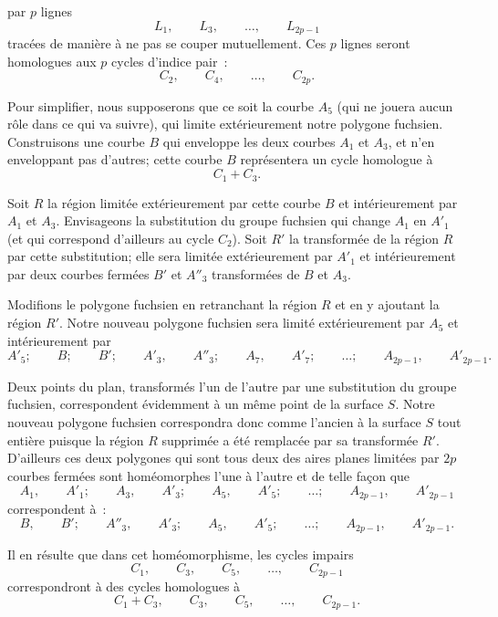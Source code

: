 \documentclass{article}
\begin{document}
par $p$ lignes
\[ L_{1}, \qquad L_{3}, \qquad \ldots, \qquad L_{2p-1} \]
tracées de manière à ne pas se couper mutuellement. Ces $p$ lignes seront homologues aux $p$ cycles d'indice pair~:
\[ C_{2}, \qquad C_{4}, \qquad \ldots, \qquad C_{2p}. \]

Pour simplifier, nous supposerons que ce soit la courbe $A_{5}$ (qui ne jouera aucun rôle dans ce qui va suivre), qui limite extérieurement notre polygone fuchsien. Construisons une courbe $B$ qui enveloppe les deux courbes $A_{1}$ et $A_{3}$, et n'en enveloppant pas d'autres; cette courbe $B$ représentera un cycle homologue à
\[ C_{1} + C_{3}. \]

Soit $R$ la région limitée extérieurement par cette courbe $B$ et intérieurement par $A_{1}$ et $A_{3}$. Envisageons la substitution du groupe fuchsien qui change $A_{1}$ en $A'_{1}$ (et qui correspond d'ailleurs au cycle $C_{2}$). Soit $R'$ la transformée de la région $R$ par cette substitution; elle sera limitée extérieurement par $A'_{1}$ et intérieurement par deux courbes fermées $B'$ et $A''_{3}$ transformées de $B$ et $A_{3}$.

Modifions le polygone fuchsien en retranchant la région $R$ et en y ajoutant la région $R'$. Notre nouveau polygone fuchsien sera limité extérieurement par $A_{5}$ et intérieurement par
\[ A'_{5}; \qquad B; \qquad B'; \qquad A'_{3}, \qquad A''_{3}; \qquad A_{7}, \qquad A'_{7}; \qquad \ldots; \qquad A_{2p-1}, \qquad A'_{2p-1}. \]

Deux points du plan, transformés l'un de l'autre par une substitution du groupe fuchsien, correspondent évidemment à un même point de la surface $S$. Notre nouveau polygone fuchsien correspondra donc comme l'ancien à la surface $S$ tout entière puisque la région $R$ supprimée a été remplacée par sa transformée $R'$. D'ailleurs ces deux polygones qui sont tous deux des aires planes limitées par $2p$ courbes fermées sont homéomorphes l'une à l'autre et de telle façon que
\[ A_{1}, \qquad A'_{1}; \qquad A_{3}, \qquad A'_{3}; \qquad A_{5}, \qquad A'_{5}; \qquad \ldots; \qquad A_{2p-1}, \qquad A'_{2p-1} \]
correspondent à~:
\[ B, \qquad B'; \qquad A''_{3}, \qquad A'_{3}; \qquad A_{5}, \qquad A'_{5}; \qquad \ldots; \qquad A_{2p-1}, \qquad A'_{2p-1}. \]

Il en résulte que dans cet homéomorphisme, les cycles impairs
\[ C_{1}, \qquad C_{3}, \qquad C_{5}, \qquad \ldots, \qquad C_{2p-1} \]
correspondront à des cycles homologues à
\[ C_{1} + C_{3}, \qquad C_{3}, \qquad C_{5}, \qquad \ldots, \qquad C_{2p-1}. \]
\end{document}
